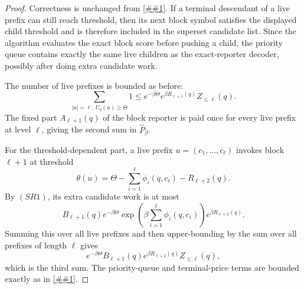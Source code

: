 \documentclass[10pt]{article}
\newcommand{\cref}[1]{\ref{##1}}
\theoremstyle{definition}
\begin{document}
\begin{proof}
   Correctness is unchanged from
   \cref{lem:additive-product-panel-decoder}.  If a terminal descendant of a
   live prefix can still reach threshold, then its next block symbol satisfies
   the displayed child threshold and is therefore included in the superset
   candidate list.  Since the algorithm evaluates the exact block score before
   pushing a child, the priority queue contains exactly the same live children
   as the exact-reporter decoder, possibly after doing extra candidate work.

   The number of live prefixes is bounded as before:
   \[
      \sum_{|u|=\ell,\ U_q(u)\ge\Theta}1
      \le
      e^{-\beta\Theta}
      e^{\beta R_{\ell+1}(q)}Z_{\le\ell}(q).
   \]
   The fixed part \(A_{\ell+1}(q)\) of the block reporter is paid once for
   every live prefix at level \(\ell\), giving the second sum in
   \(\widehat P_\beta\).

   For the threshold-dependent part, a live prefix
   \(u=(c_1,\ldots,c_\ell)\) invokes block \(\ell+1\) at threshold
   \[
      \theta(u)=
      \Theta-\sum_{i=1}^{\ell}\phi_i(q,c_i)-R_{\ell+2}(q).
   \]
   By \((SR1)\), its extra candidate work is at most
   \[
      B_{\ell+1}(q)
      e^{-\beta\Theta}
      \exp\!\left(\beta\sum_{i=1}^{\ell}\phi_i(q,c_i)\right)
      e^{\beta R_{\ell+2}(q)}.
   \]
   Summing this over all live prefixes and then upper-bounding by the sum over
   all prefixes of length \(\ell\) gives
   \[
      e^{-\beta\Theta}
      B_{\ell+1}(q)e^{\beta R_{\ell+2}(q)}Z_{\le\ell}(q),
   \]
   which is the third sum.  The priority-queue and terminal-price terms are
   bounded exactly as in \cref{lem:additive-product-panel-decoder}.
\end{proof}
\end{document}

